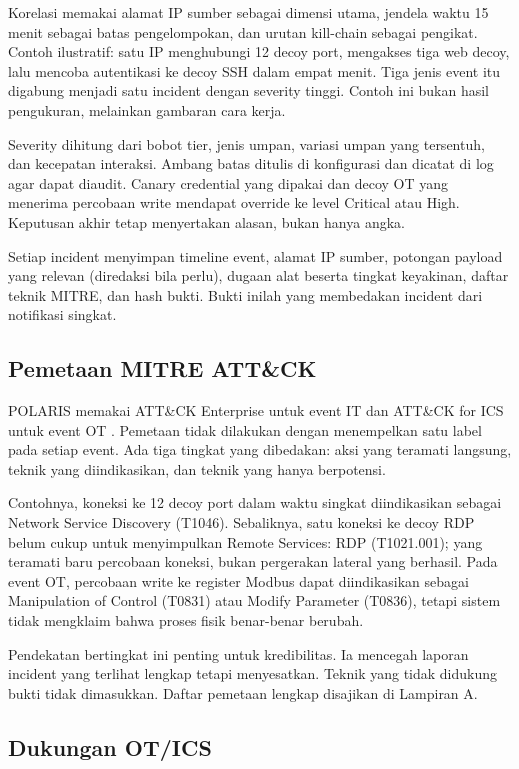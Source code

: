 \documentclass[12pt,a4paper]{article}
\begin{document}
Korelasi memakai alamat IP sumber sebagai dimensi utama, jendela waktu 15 menit sebagai batas pengelompokan, dan urutan kill-chain sebagai pengikat. Contoh ilustratif: satu IP menghubungi 12 decoy port, mengakses tiga web decoy, lalu mencoba autentikasi ke decoy SSH dalam empat menit. Tiga jenis event itu digabung menjadi satu incident dengan severity tinggi. Contoh ini bukan hasil pengukuran, melainkan gambaran cara kerja.

Severity dihitung dari bobot tier, jenis umpan, variasi umpan yang tersentuh, dan kecepatan interaksi. Ambang batas ditulis di konfigurasi dan dicatat di log agar dapat diaudit. Canary credential yang dipakai dan decoy OT yang menerima percobaan write mendapat override ke level Critical atau High. Keputusan akhir tetap menyertakan alasan, bukan hanya angka.

Setiap incident menyimpan timeline event, alamat IP sumber, potongan payload yang relevan (diredaksi bila perlu), dugaan alat beserta tingkat keyakinan, daftar teknik MITRE, dan hash bukti. Bukti inilah yang membedakan incident dari notifikasi singkat.

\subsection{Pemetaan MITRE ATT\&CK}

POLARIS memakai ATT\&CK Enterprise untuk event IT dan ATT\&CK for ICS untuk event OT \citep{mitre_attack,mitre_ics}. Pemetaan tidak dilakukan dengan menempelkan satu label pada setiap event. Ada tiga tingkat yang dibedakan: aksi yang teramati langsung, teknik yang diindikasikan, dan teknik yang hanya berpotensi.

Contohnya, koneksi ke 12 decoy port dalam waktu singkat diindikasikan sebagai Network Service Discovery (T1046). Sebaliknya, satu koneksi ke decoy RDP belum cukup untuk menyimpulkan Remote Services: RDP (T1021.001); yang teramati baru percobaan koneksi, bukan pergerakan lateral yang berhasil. Pada event OT, percobaan write ke register Modbus dapat diindikasikan sebagai Manipulation of Control (T0831) atau Modify Parameter (T0836), tetapi sistem tidak mengklaim bahwa proses fisik benar-benar berubah.

Pendekatan bertingkat ini penting untuk kredibilitas. Ia mencegah laporan incident yang terlihat lengkap tetapi menyesatkan. Teknik yang tidak didukung bukti tidak dimasukkan. Daftar pemetaan lengkap disajikan di Lampiran A.

\subsection{Dukungan OT/ICS}
\end{document}
